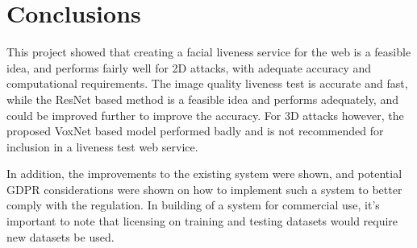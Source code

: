 \documentclass[11pt,a4paper]{article}
\begin{document}
\section{Conclusions}
    This project showed that creating a facial liveness service for the web is a feasible idea, and performs fairly well for 2D attacks, with adequate accuracy and computational requirements.
    The image quality liveness test is accurate and fast, while the ResNet based method is a feasible idea and performs adequately, and could be improved further to improve the accuracy. For 3D attacks however, the
    proposed VoxNet based model performed badly and is not recommended for inclusion in a liveness test web service.

    In addition, the improvements to the existing system were shown, and potential GDPR considerations were shown on how to implement such a system to better comply with the regulation. In building of a system for commercial use, it's important
    to note that licensing on training and testing datasets would require new datasets be used.

\printglossary


\end{document}
